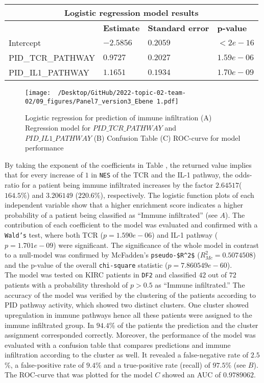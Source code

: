 \documentclass[
  parskip,
  oneside]{\documentclass[oneside]{book}}
\begin{document}
\begin{table}[ht]
 \begin{tabular}{ |p{4.5cm}||p{3cm}|p{3cm}|p{3cm}|  }
  \hline
  \multicolumn{4}{|c|}{Logistic regression model results} \\
  \hline
   & \textbf{Estimate} & \textbf{Standard error} & \textbf{p-value}\\
  \hline
  Intercept   &  $-2.5856$  & $0.2059$ &   $<2e-16$\\
  PID\_TCR\_PATHWAY &   $0.9727$  & $0.2027$   & $1.59e-06$\\
  PID\_IL1\_PATHWAY & $1.1651$ & $0.1934$ &  $1.70e-09$\\
 \hline
 \end{tabular}
 \label{tab}
\end{table}

\begin{figure}[t]
  \texttt{[image: ~/Desktop/GitHub/2022-topic-02-team-02/09\_figures/Panel7\_version3\_Ebene 1.pdf]}
  \caption{Logistic regression for prediction of immune infiltration (A) Regression model for $PID\_TCR\_PATHWAY$ and $PID\_IL1\_PATHWAY$ (B) Confusion Table (C) ROC-curve for model performance}
  \label{log}
\end{figure}

By taking the exponent of the coefficients in Table , the
returned value implies that for every increase of \(1\) in \texttt{NES}
of the TCR and the IL-1 pathway, the odds-ratio for a patient being
immune infiltrated increases by the factor \(2.64517\)(\(164.5\%\)) and
\(3.206149\) (\(220.6\%\)), respectively. The logistic function plots of
each independent variable show that a higher enrichment score indicates
a higher probability of a patient being classified as ``Immune
infiltrated'' (see  \(A\)). The contribution of each
coefficient to the model was evaluated and confirmed with a
\texttt{Wald’s} test, where both TCR (\(p= 1.590e-06\)) and IL-1 pathway
(\(p= 1.701e-09\)) were significant. The significance of the whole model
in contrast to a null-model was confirmed by McFadden's
\texttt{pseudo-\$R\^{}2\$} (\(R_{Mc}^2=0.5074508\)) and the p-value of
the overall \texttt{chi-square} statistic (\(p=7.860549e-60\)).\\
The model was tested on KIRC patients in \texttt{DF2} and classified
\(42\) out of \(72\) patients with a probability threshold of
\(p > 0.5\) as ``Immune infiltrated.'' The accuracy of the model was
verified by the clustering of the patients according to PID pathway
activity, which showed two distinct clusters. One cluster showed
upregulation in immune pathways hence all these patients were assigned
to the immune infiltrated group. In \(94.4\)\% of the patients the
prediction and the cluster assignment corresponded correctly. Moreover,
the performance of the model was evaluated with a confusion table that
compares predictions and immune infiltration according to the cluster as
well. It revealed a false-negative rate of \(2.5\)\%, a false-positive
rate of \(9.4\)\% and a true-positive rate (recall) of \(97.5\)\% (see
 \(B\)). The ROC-curve that was plotted for the model
\(C\) showed an AUC of \(0.9789062\).
\end{document}

